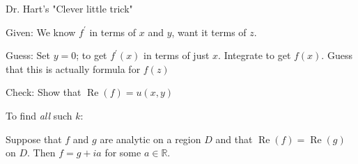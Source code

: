 \documentclass{beamer}
\newcommand{\R}{\mathbb{R}}
\DeclareMathOperator{\Real}{Re}
\begin{document}
\begin{frame}{Dr. Hart's "Clever little trick"}
\begin{block}{Given:}
We know $f^\prime$ in terms of $x$ and $y$, want it terms of $z$.
\end{block}

\begin{block}{Guess:}
Set $y=0$; to get $f^\prime(x)$ in terms of just $x$.  Integrate to get $f(x)$.  Guess that this is actually formula for $f(z)$
\end{block}

\begin{block}{Check:}
Show that $\Real(f)=u(x,y)$
\end{block}
\begin{block}{To find \emph{all} such $k$:}
\begin{lemma}Suppose that $f$ and $g$ are analytic on a region $D$ and that $\Real(f)=\Real(g)$ on $D$.  Then $f=g+ia$ for some $a\in\R.$
\end{lemma}
\end{block}

\end{frame}
\end{document}
